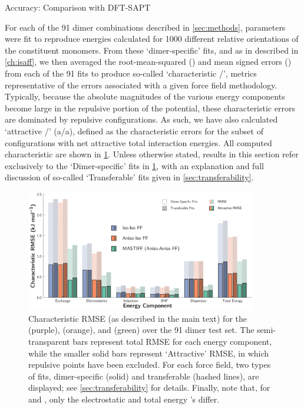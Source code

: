 \begin{subsection}{Accuracy: Comparison with DFT-SAPT}

For each of the 91 dimer combinations described in \cref{sec:methods},
parameters were fit to reproduce \sapt energies calculated for 1000 different
relative orientations of the constituent monomers. 
From these `dimer-specific' fits, and as in
described in \cref{ch:isaff},\cite{VanVleet2016} we then averaged the
root-mean-squared (\rmse) and mean signed errors (\mse) from each of the 91
fits to produce so-called `characteristic \rmse/\mse', metrics
representative of the errors associated with a given force field methodology.
Typically, because the absolute magnitudes of the various energy components
become large in the repulsive portion of the potential, these characteristic
errors are dominated by repulsive
configurations. As such,
we have also calculated `attractive
\rmse/\mse' (a\rmse/a\mse), defined as the characteristic errors for the subset
of configurations with net attractive total interaction energies. 
All computed characteristic \rmse are shown in \cref{fig:rmse}.
Unless otherwise stated, results in this section refer
exclusively to the `Dimer-specific' fits in \cref{fig:rmse}, with an
explanation and full discussion of so-called `Transferable' fits given in
\cref{sec:transferability}.

    \begin{figure}
    \includegraphics[width=0.9\textwidth]{anisotropic/rmse_comparisons/transferability_rmse_errors.pdf}
    \caption{
    Characteristic RMSE (as described in the main text) for the \isoff
(purple), \isaff (orange), and \mastiff (green) over the 91
    dimer test set. The semi-transparent bars represent total RMSE
    for each energy component, while the smaller solid bars represent `Attractive'
    RMSE, in which repulsive points have been excluded. For each force field,
    two types of fits, dimer-specific (solid) and transferable (hashed lines),
    are displayed; see \cref{sec:transferability} for details. Finally, note that, for \isoff and \isaff, only the electrostatic
    and total energy \rmse's differ. 
            }
    \label{fig:rmse}
    \end{figure}


\end{subsection}
